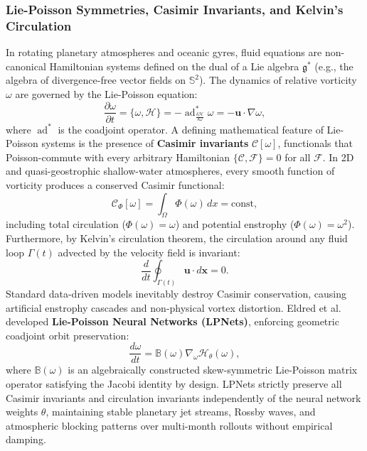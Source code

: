 \subsubsection{Lie-Poisson Symmetries, Casimir Invariants, and Kelvin's Circulation}
In rotating planetary atmospheres and oceanic gyres, fluid equations are non-canonical Hamiltonian systems defined on the dual of a Lie algebra $\mathfrak{g}^*$ (e.g., the algebra of divergence-free vector fields on $\mathbb{S}^2$). The dynamics of relative vorticity $\omega$ are governed by the Lie-Poisson equation:
\begin{equation}
    \frac{\partial \omega}{\partial t} = \{\omega, \mathcal{H}\} = -\operatorname{ad}^*_{\frac{\delta \mathcal{H}}{\delta \omega}} \omega = - \mathbf{u} \cdot \nabla \omega,
    \label{eq:lie_poisson_pde}
\end{equation}
where $\operatorname{ad}^*$ is the coadjoint operator. A defining mathematical feature of Lie-Poisson systems is the presence of \textbf{Casimir invariants} $\mathcal{C}[\omega]$, functionals that Poisson-commute with every arbitrary Hamiltonian $\{\mathcal{C}, \mathcal{F}\} = 0$ for all $\mathcal{F}$. In 2D and quasi-geostrophic shallow-water atmospheres, every smooth function of vorticity produces a conserved Casimir functional:
\begin{equation}
    \mathcal{C}_\Phi[\omega] = \int_{\Omega} \Phi(\omega) \, dx = \text{const},
\end{equation}
including total circulation ($\Phi(\omega) = \omega$) and potential enstrophy ($\Phi(\omega) = \omega^2$). Furthermore, by Kelvin's circulation theorem, the circulation around any fluid loop $\Gamma(t)$ advected by the velocity field is invariant:
\begin{equation}
    \frac{d}{dt} \oint_{\Gamma(t)} \mathbf{u} \cdot d\mathbf{x} = 0.
\end{equation}
Standard data-driven models inevitably destroy Casimir conservation, causing artificial enstrophy cascades and non-physical vortex distortion. Eldred et al.~\cite{eldred2023lpnets} developed \textbf{Lie-Poisson Neural Networks (LPNets)}, enforcing geometric coadjoint orbit preservation:
\begin{equation}
    \frac{d\omega}{dt} = \mathbb{B}(\omega) \nabla_\omega \mathcal{H}_\theta(\omega),
\end{equation}
where $\mathbb{B}(\omega)$ is an algebraically constructed skew-symmetric Lie-Poisson matrix operator satisfying the Jacobi identity by design. LPNets strictly preserve all Casimir invariants and circulation invariants independently of the neural network weights $\theta$, maintaining stable planetary jet streams, Rossby waves, and atmospheric blocking patterns over multi-month rollouts without empirical damping.

